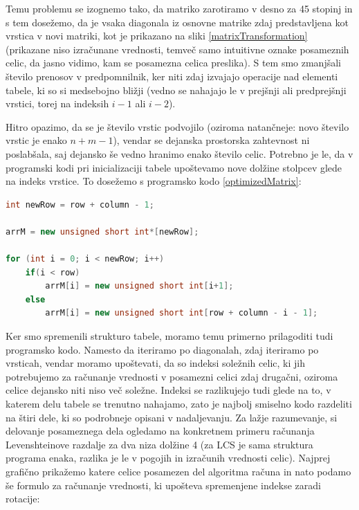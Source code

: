 \documentclass[a4paper,12pt,openright]{book}
\begin{document}
Temu problemu se izognemo tako, da matriko zarotiramo v desno za 45 stopinj in s tem dosežemo, da je vsaka diagonala iz osnovne matrike zdaj predstavljena kot vrstica v novi matriki, kot je prikazano na sliki \ref{matrixTransformation} (prikazane niso izračunane vrednosti, temveč samo intuitivne oznake posameznih celic, da jasno vidimo, kam se posamezna celica preslika). S tem smo zmanjšali število prenosov v predpomnilnik, ker niti zdaj izvajajo operacije nad elementi tabele, ki so si medsebojno bližji (vedno se nahajajo le v prejšnji ali predprejšnji vrstici, torej na indeksih $i-1$ ali $i-2$). 

Hitro opazimo, da se je število vrstic podvojilo (oziroma natančneje: novo število vrstic je enako $n+m-1$), vendar se dejanska prostorska zahtevnost ni poslabšala, saj dejansko še vedno hranimo enako število celic. Potrebno je le, da v programski kodi pri inicializaciji tabele upoštevamo nove dolžine stolpcev glede na indeks vrstice. To dosežemo s programsko kodo \ref{optimizedMatrix}: 

\bigskip
\bigskip

\begin{lstlisting}[language=C++, caption={Inicializacija optimizirane tabele}, captionpos=b, label=optimizedMatrix]
int newRow = row + column - 1;

arrM = new unsigned short int*[newRow];

for (int i = 0; i < newRow; i++) 
    if(i < row)
        arrM[i] = new unsigned short int[i+1];
    else
        arrM[i] = new unsigned short int[row + column - i - 1];
\end{lstlisting}

\bigskip
\bigskip

Ker smo spremenili strukturo tabele, moramo temu primerno prilagoditi tudi programsko kodo. Namesto da iteriramo po diagonalah, zdaj iteriramo po vrsticah, vendar moramo upoštevati, da so indeksi soležnih celic, ki jih potrebujemo za računanje vrednosti v posamezni celici zdaj drugačni, oziroma celice dejansko niti niso več soležne. Indeksi se razlikujejo tudi glede na to, v katerem delu tabele se trenutno nahajamo, zato je najbolj smiselno kodo razdeliti na štiri dele, ki so podrobneje opisani v nadaljevanju. Za lažje razumevanje, si delovanje posameznega dela ogledamo na konkretnem primeru računanja Levenshteinove razdalje za dva niza dolžine 4 (za LCS je sama struktura programa enaka, razlika je le v pogojih in izračunih vrednosti celic). Najprej grafično prikažemo katere celice posamezen del algoritma računa in nato podamo še formulo za računanje vrednosti, ki upošteva spremenjene indekse zaradi rotacije: 
\end{document}

